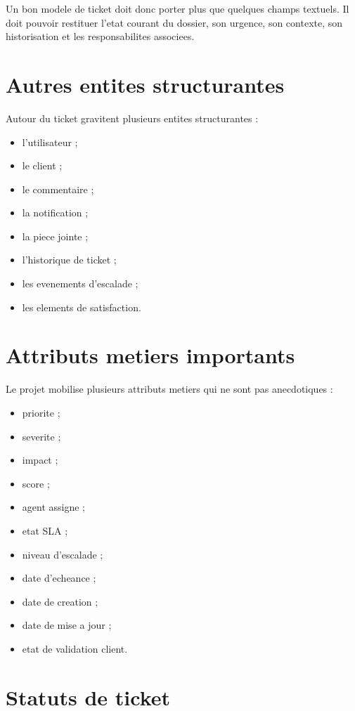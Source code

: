 Un bon modele de ticket doit donc porter plus que quelques champs textuels. Il doit pouvoir restituer l'etat courant du dossier, son urgence, son contexte, son historisation et les responsabilites associees.

\section{Autres entites structurantes}

Autour du ticket gravitent plusieurs entites structurantes :

\begin{itemize}[leftmargin=1.2cm]
  \item l'utilisateur ;
  \item le client ;
  \item le commentaire ;
  \item la notification ;
  \item la piece jointe ;
  \item l'historique de ticket ;
  \item les evenements d'escalade ;
  \item les elements de satisfaction.
\end{itemize}

\section{Attributs metiers importants}

Le projet mobilise plusieurs attributs metiers qui ne sont pas anecdotiques :

\begin{itemize}[leftmargin=1.2cm]
  \item priorite ;
  \item severite ;
  \item impact ;
  \item score ;
  \item agent assigne ;
  \item etat SLA ;
  \item niveau d'escalade ;
  \item date d'echeance ;
  \item date de creation ;
  \item date de mise a jour ;
  \item etat de validation client.
\end{itemize}

\section{Statuts de ticket}

